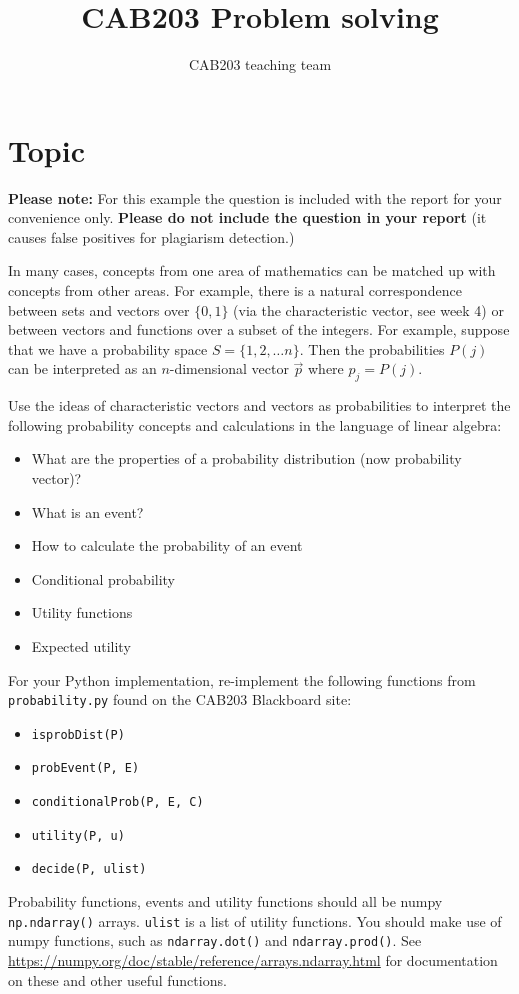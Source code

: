 \documentclass[a4paper]{exam}
\author{CAB203 teaching team}
\title{CAB203 Problem solving}
\date{}
\begin{document}
\maketitle

\section{Topic}

\textbf{Please note:} For this example the question is included with the report for your convenience only.  \textbf{Please do not include the question in your report} (it causes false positives for plagiarism detection.)

In many cases, concepts from one area of mathematics can be matched up with concepts from other areas.  For example, there is a natural correspondence between sets and vectors over $\{0,1\}$ (via the characteristic vector, see week 4) or between vectors and functions over a subset of the integers.  For example, suppose that we have a probability space $S = \{ 1, 2, \dots  n \}$.  Then the probabilities $P(j)$ can be interpreted as an $n$-dimensional vector $\vec{p}$ where $p_j = P(j)$.

Use the ideas of characteristic vectors and vectors as probabilities to interpret the following probability concepts and calculations in the language of linear algebra:
\begin{itemize}
   \item What are the properties of a probability distribution (now probability vector)?
   \item What is an event?
   \item How to calculate the probability of an event
   \item Conditional probability
   \item Utility functions
   \item Expected utility
\end{itemize}
For your Python implementation, re-implement the following functions from \verb+probability.py+ found on the CAB203 Blackboard site:
\begin{itemize}
   \item \lstinline!isprobDist(P)!
   \item \lstinline!probEvent(P, E)!
   \item \lstinline!conditionalProb(P, E, C)!
   \item \lstinline!utility(P, u)!
   \item \lstinline!decide(P, ulist)!
\end{itemize}
Probability functions, events and utility functions should all be numpy \lstinline!np.ndarray()! arrays.  \lstinline!ulist! is a list of utility functions.  You should make use of numpy functions, such as \lstinline!ndarray.dot()! and \lstinline!ndarray.prod()!.  See \url{https://numpy.org/doc/stable/reference/arrays.ndarray.html} for documentation on these and other useful functions.
\end{document}
